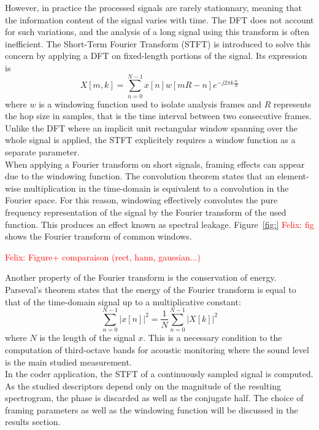 \documentclass[12pt,times,onecolumn]{article}
\newcommand{\fg}[1]{\textcolor{red}{ Felix: #1}}
\begin{document}
However, in practice the processed signals are rarely stationnary, meaning that the information content of the signal varies with time. The DFT does not account for such variations, and the analysis of a long signal using this transform is often inefficient. The Short-Term Fourier Transform (STFT) is introduced to solve this concern by applying a DFT on fixed-length portions of the signal. Its expression is
\begin{equation} \label{eq:2}
X[m, k] = \sum\limits_{n = 0}^{N-1} x[n]w[mR-n]e^{-j2\pi k\frac{n}{N}}
\end{equation}
where $w$ is a windowing function used to isolate analysis frames and $R$ represents the hop size in samples, that is the time interval between two consecutive frames. Unlike the DFT where an implicit unit rectangular window spanning over the whole signal is applied, the STFT explicitely requires a window function as a separate parameter.\\

When applying a Fourier transform on short signals, framing effects can appear due to the windowing function. The convolution theorem states that an element-wise multiplication in the time-domain is equivalent to a convolution in the Fourier space. For this reason, windowing effectively convolutes the pure frequency representation of the signal by the Fourier transform of the used function. This produces an effect known as spectral leakage. Figure~\ref{fig:} \fg{fig} shows the Fourier transform of common windows.

\fg{Figure+ comparaison (rect, hann, gaussian...)}


Another property of the Fourier transform is the conservation of energy. Parseval's theorem states that the energy of the Fourier transform is equal to that of the time-domain signal up to a multiplicative constant:
\begin{equation}
\sum\limits_{n=0}^{N-1}|x[n]|^2 = \frac{1}{N}\sum\limits_{n=0}^{N-1}|X[k]|^2
\end{equation}
where $N$ is the length of the signal $x$. This is a necessary condition to the computation of third-octave bands for acoustic monitoring where the sound level is the main studied measurement.\\

In the coder application, the STFT of a continuously sampled signal is computed. As the studied descriptors depend only on the magnitude of the resulting spectrogram, the phase is discarded as well as the conjugate half. The choice of framing parameters as well as the windowing function will be discussed in the results section.
\end{document}
